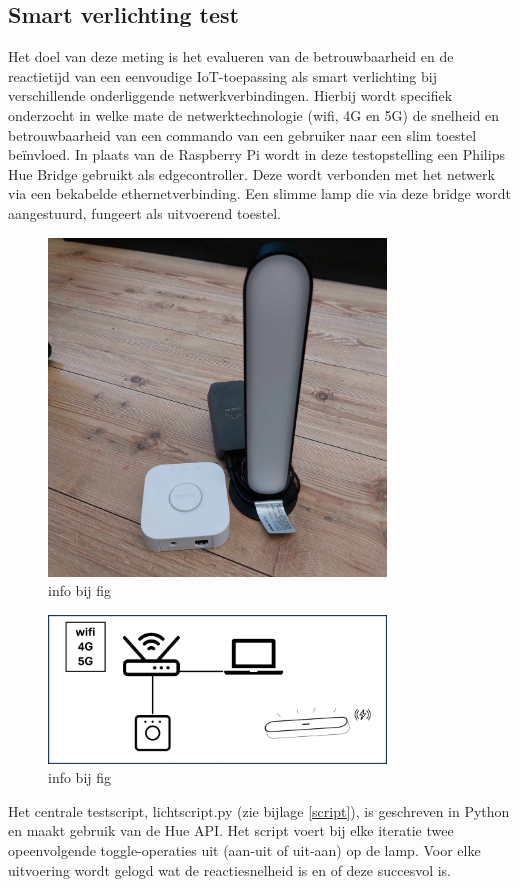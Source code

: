 \subsection{Smart verlichting test}
Het doel van deze meting is het evalueren van de betrouwbaarheid en de reactietijd van een eenvoudige IoT-toepassing als smart verlichting bij verschillende onderliggende netwerkverbindingen.
Hierbij wordt specifiek onderzocht in welke mate de netwerktechnologie (wifi, 4G en 5G) de snelheid en betrouwbaarheid van een commando van een gebruiker naar een slim toestel beïnvloed.
In plaats van de Raspberry Pi wordt in deze testopstelling een Philips Hue Bridge gebruikt als edgecontroller. Deze wordt verbonden met het netwerk via een bekabelde ethernetverbinding. Een slimme lamp die via deze bridge wordt aangestuurd, fungeert als uitvoerend toestel.

\begin{figure}
    
    \includegraphics[width=0.8\textwidth]{../graphics/philips_hue.jpg}
    \caption[philips hue hardware]{\label{fig:philips}info bij fig}
\end{figure}
\begin{figure}
    
    \includegraphics[width=0.8\textwidth]{../graphics/Opstelling_2.jpg}
    \caption[philips opstelling]{\label{fig:opstellingphilips}info bij fig}
\end{figure}
Het centrale testscript, lichtscript.py (zie bijlage \ref{script}), is geschreven in Python en maakt gebruik van de Hue API. Het script voert bij elke iteratie twee opeenvolgende toggle-operaties uit (aan-uit of uit-aan) op de lamp. Voor elke uitvoering wordt gelogd wat de reactiesnelheid is en of deze succesvol is.




